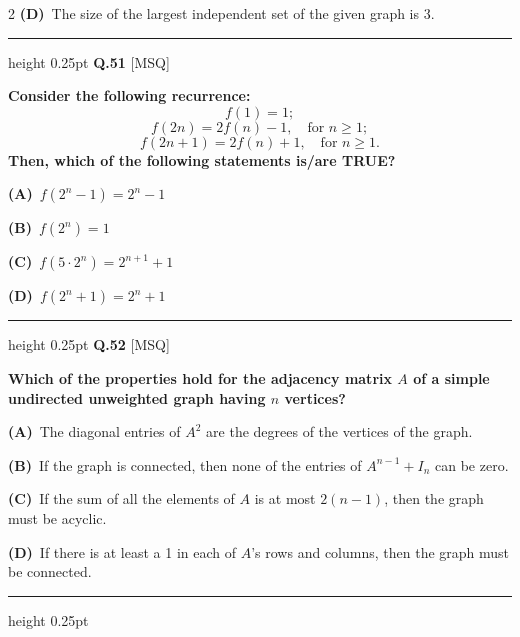 \documentclass[a4paper,10pt,twoside]{article}
\begin{document}
\begin{multicols}{2}
\textbf{(D)}~The size of the largest independent set of the given graph is 3.
\par\vspace{6pt}\hrule height 0.25pt\vspace{6pt}
\noindent\textbf{Q.51} \hfill {\footnotesize\textsf{[MSQ]}}
\par\vspace{2pt}
{\bfseries Consider the following recurrence:
\[ f(1) = 1; \]
\[ f(2n) = 2f(n) - 1, \quad \text{for } n \ge 1; \]
\[ f(2n+1) = 2f(n) + 1, \quad \text{for } n \ge 1. \]
Then, which of the following statements is/are TRUE? \par}
\par\vspace{2pt}\noindent
\textbf{(A)}~$f(2^n - 1) = 2^n - 1$\par\vspace{2pt}\noindent
\textbf{(B)}~$f(2^n) = 1$\par\vspace{2pt}\noindent
\textbf{(C)}~$f(5 \cdot 2^n) = 2^{n+1} + 1$\par\vspace{2pt}\noindent
\textbf{(D)}~$f(2^n + 1) = 2^n + 1$
\par\vspace{6pt}\hrule height 0.25pt\vspace{6pt}
\noindent\textbf{Q.52} \hfill {\footnotesize\textsf{[MSQ]}}
\par\vspace{2pt}
{\bfseries Which of the properties hold for the adjacency matrix $A$ of a simple undirected unweighted graph having $n$ vertices? \par}
\par\vspace{2pt}\noindent
\textbf{(A)}~The diagonal entries of $A^2$ are the degrees of the vertices of the graph.\par\vspace{2pt}\noindent
\textbf{(B)}~If the graph is connected, then none of the entries of $A^{n-1} + I_n$ can be zero.\par\vspace{2pt}\noindent
\textbf{(C)}~If the sum of all the elements of $A$ is at most $2(n - 1)$, then the graph must be acyclic.\par\vspace{2pt}\noindent
\textbf{(D)}~If there is at least a 1 in each of $A$'s rows and columns, then the graph must be connected.
\par\vspace{6pt}\hrule height 0.25pt\vspace{6pt}

\end{multicols}
\end{document}
